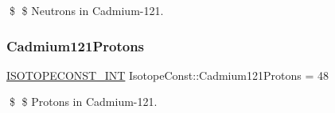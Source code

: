 \$ \$ Neutrons in Cadmium-\/121. \mbox{\label{group___isotope_const-_cadmium-_cd121_ga52166eb12215099f2f102285c13eecbb}} 
\subsubsection{\texorpdfstring{Cadmium121\+Protons}{Cadmium121Protons}}
{\footnotesize\ttfamily \mbox{\hyperlink{group___isotope_const-_macros_ga5f18360b3e99483a35c32d789e62621c}{I\+S\+O\+T\+O\+P\+E\+C\+O\+N\+S\+T\+\_\+\+I\+NT}} Isotope\+Const\+::\+Cadmium121\+Protons = 48}

\$ \$ Protons in Cadmium-\/121. 